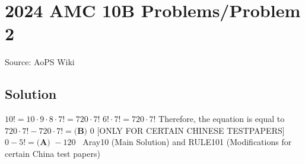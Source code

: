 \documentclass[12pt]{article}
\begin{document}
\section*{{2024 AMC 10B Problems/Problem 2}}
Source: AoPS Wiki

\subsection*{Solution}
$10! = 10 \cdot 9 \cdot 8 \cdot 7! = 720 \cdot 7!$ $6! \cdot 7! = 720 \cdot 7!$ Therefore, the equation is equal to $720 \cdot 7! - 720 \cdot 7! = \boxed{\textbf{(B) }0}$ [ONLY FOR CERTAIN CHINESE TESTPAPERS] $0 - 5! = \boxed{\textbf{(A) }-120}$ ~Aray10 (Main Solution) and RULE101 (Modifications for certain China test papers)
\end{document}

